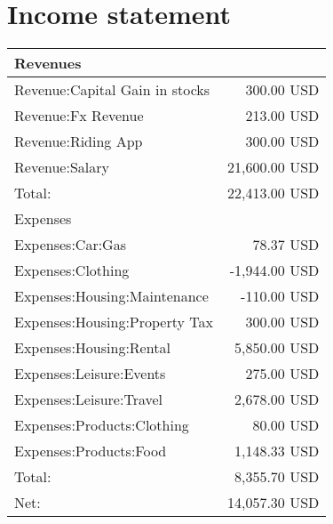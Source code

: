 \documentclass[11pt]{article}
\begin{document}
\section{Income statement}
\label{sec:org882796f}
\begin{center}
\begin{tabular}{lr} \toprule
Revenues   & \\ \midrule
Revenue:Capital Gain in stocks & 300.00 USD  \\
Revenue:Fx Revenue & 213.00 USD  \\
Revenue:Riding App & 300.00 USD  \\
Revenue:Salary & 21,600.00 USD  \\ \midrule
Total: & 22,413.00 USD  \\ \midrule
Expenses   & \\ \midrule
Expenses:Car:Gas & 78.37 USD  \\
Expenses:Clothing & -1,944.00 USD  \\
Expenses:Housing:Maintenance & -110.00 USD  \\
Expenses:Housing:Property Tax & 300.00 USD  \\
Expenses:Housing:Rental & 5,850.00 USD  \\
Expenses:Leisure:Events & 275.00 USD  \\
Expenses:Leisure:Travel & 2,678.00 USD  \\
Expenses:Products:Clothing & 80.00 USD  \\
Expenses:Products:Food & 1,148.33 USD  \\ \midrule
Total: & 8,355.70 USD  \\ \midrule
Net: & 14,057.30 USD  \\ \bottomrule
\end{tabular}
\end{center}
\end{document}

